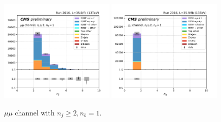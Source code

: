 \begin{figure}[ht]
    \includegraphics[width=0.49\textwidth]{chapters/Appendix/sectionPlots/figures/kinematics_pickles/mumu/1b/mumu_1b_nJets.pdf}
    \includegraphics[width=0.49\textwidth]{chapters/Appendix/sectionPlots/figures/kinematics_pickles/mumu/1b/mumu_1b_nBJets.pdf}
    
    \caption{$\mu \mu$ channel with $n_j\geq2, n_b=1$.}
\end{figure}


